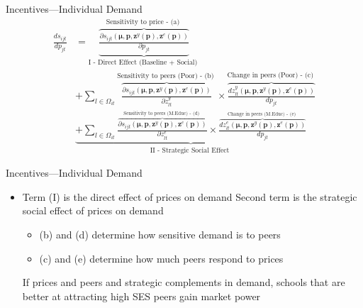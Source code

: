 \documentclass[dvipsnames]{beamer}
\begin{document}
%
\begin{frame}{Incentives---Individual Demand}
  \begin{align*}
    \frac{d s_{i j t}}{d p_{j t}}&=\underbrace{\overbrace{\frac{\partial s_{i j t}\left(\boldsymbol{\mu}, \mathbf{p}, \mathbf{z}^{y}(\mathbf{p}), \mathbf{z}^{e}(\mathbf{p})\right)}{\partial p_{j t}}}^{\text {Sensitivity to price - (a) }}}_{\text {I - Direct Effect (Baseline + Social) }}\\[1em]
                                 &+\sum_{l \in \Omega_{i t}} \overbrace{\frac{\partial s_{i j t}\left(\boldsymbol{\mu}, \mathbf{p}, \mathbf{z}^{y}(\mathbf{p}), \mathbf{z}^{e}(\mathbf{p})\right)}{\partial z_{l t}^{y}}}^{\text {Sensitivity to peers (Poor) - (b) }} \times \overbrace{\frac{d z_{l t}^{y}\left(\boldsymbol{\mu}, \mathbf{p}, \mathbf{z}^{y}(\mathbf{p}), \mathbf{z}^{e}(\mathbf{p})\right)}{d p_{j t}}}^{\text {Change in peers (Poor) - (c) }}\\[1em]
    &\underbrace{+\sum_{l \in \Omega_{i t}} \frac{\overbrace{\partial s_{i j t}\left(\boldsymbol{\mu}, \mathbf{p}, \mathbf{z}^{y}(\mathbf{p}), \mathbf{z}^{e}(\mathbf{p})\right)}^{\text {Sensitivity to peers (M.Educ) - (d) }}}{\partial z_{l t}^{e}} \times \frac{\overbrace{d z_{l t}^{e}\left(\boldsymbol{\mu}, \mathbf{p}, \mathbf{z}^{y}(\mathbf{p}), \mathbf{z}^{e}(\mathbf{p})\right)}^{\text {Change in peers (M.Educ) - (e) }}}{d p_{j t}}}_{\text {II - Strategic Social Effect }}
  \end{align*} 
\end{frame}
%
\begin{frame}{Incentives---Individual Demand}
  \begin{itemize}
  \item Term (I) is the direct effect of prices on demand
    \vitem Second term is the strategic social effect of prices on demand
    \begin{itemize}
    \item (b) and (d) determine how sensitive demand is to peers
      \item (c) and (e) determine how much peers respond to prices
      \end{itemize}
      \vitem If prices and peers and strategic complements in demand, schools that are better at attracting high SES peers gain market power
  \end{itemize}
\end{frame}
%
\end{document}

